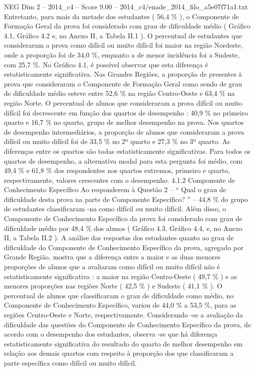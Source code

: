 \begin{textsample}{NEG Dim 2 – 2014\_c4 – Score 9.00 – 2014\_c4/enade\_2014\_filo\_a5e07f71a1.txt}
Entretanto, para mais da metade dos estudantes ( 56,4 \% ), o Componente de Formação Geral da prova foi considerado com grau de dificuldade médio ( Gráfico 4.1, Gráfico 4.2 e, no Anexo II, a Tabela II.1 ).
O percentual de estudantes que consideraram a prova como difícil ou muito difícil foi maior na região Nordeste, onde a proporção foi de 34,0 \%, enquanto a de menor incidência foi a Sudeste, com 25,7 \%.
No Gráfico 4.1, é possível observar que esta diferença é estatisticamente significativa.
Nas Grandes Regiões, a proporção de presentes à prova que consideraram o Componente de Formação Geral como sendo de grau de dificuldade médio esteve entre 52,6 \% na região Centro-Oeste e 63,4 \% na região Norte.
O percentual de alunos que consideraram a prova difícil ou muito difícil foi decrescente em função dos quartos de desempenho : 40,9 \% no primeiro quarto e 16,7 \% no quarto, grupo de melhor desempenho na prova.
Nos quartos de desempenho intermediários, a proporção de alunos que consideraram a prova difícil ou muito difícil foi de 33,5 \% no 2º quarto e 27,3 \% no 3º quarto.
As diferenças entre os quartos são todas estatisticamente significativas.
Para todos os quartos de desempenho, a alternativa modal para esta pergunta foi médio, com 49,4 \% e 61,8 \% dos respondentes nos quartos extremos, primeiro e quarto, respectivamente, valores crescentes com o desempenho. 4.1.2 Componente de Conhecimento Específico Ao responderem à Questão 2 – “ Qual o grau de dificuldade desta prova na parte de Componente Específico? ” – 44,8 \% do grupo de estudantes classificaram -na como difícil ou muito difícil.
Além disso, o Componente de Conhecimento Específico da prova foi considerado com grau de dificuldade médio por 48,4 \% dos alunos ( Gráfico 4.3, Gráfico 4.4, e, no Anexo II, a Tabela II.2 ).
A análise das respostas dos estudantes quanto ao grau de dificuldade do Componente de Conhecimento Específico da prova, agregado por Grande Região, mostra que a diferença entre a maior e as duas menores proporções de alunos que a avaliaram como difícil ou muito difícil não é estatisticamente significativa : a maior na região Centro-Oeste ( 49,7 \% ) e as menores proporções nas regiões Norte ( 42,5 \% ) e Sudeste ( 41,1 \% ).
O percentual de alunos que classificaram o grau de dificuldade como médio, no Componente de Conhecimento Específico, variou de 44,0 \% a 53,5 \%, para as regiões Centro-Oeste e Norte, respectivamente.
Considerando -se a avaliação da dificuldade das questões do Componente de Conhecimento Específico da prova, de acordo com o desempenho dos estudantes, observa -se que há diferença estatisticamente significativa do resultado do quarto de melhor desempenho em relação aos demais quartos com respeito à proporção dos que classificaram a parte específica como difícil ou muito difícil.

\end{textsample}
